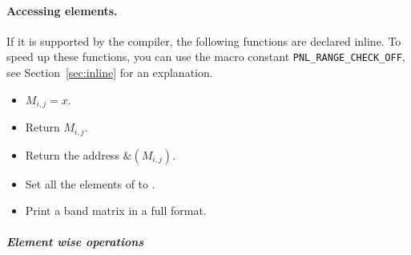 \paragraph{Accessing elements.}

If it is supported by the compiler, the following functions are declared
inline. To speed up these functions, you can use the macro constant
\texttt{PNL_RANGE_CHECK_OFF}, see Section~\ref{sec:inline} for an explanation. 
\begin{itemize}
\item {}
  \sshortdescribe $M_{i, j}=x$.

\item {}
    \sshortdescribe Return $M_{i, j}$.

\item {}
    \sshortdescribe Return the address $\&(M_{i, j})$.
\item {}
    \sshortdescribe Set all the elements of  to .

  \item {}
    \sshortdescribe Print a band matrix in a full format.
\end{itemize}

\subparagraph{Element wise operations}

